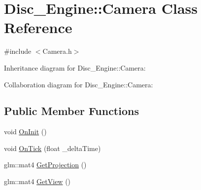\hypertarget{class_disc___engine_1_1_camera}{}\section{Disc\+\_\+\+Engine\+:\+:Camera Class Reference}
\label{class_disc___engine_1_1_camera}


{\ttfamily \#include $<$Camera.\+h$>$}



Inheritance diagram for Disc\+\_\+\+Engine\+:\+:Camera\+:


Collaboration diagram for Disc\+\_\+\+Engine\+:\+:Camera\+:
\subsection*{Public Member Functions}
\begin{DoxyCompactItemize}
\item 
void \mbox{\hyperlink{class_disc___engine_1_1_camera_a0be8fe3db58db7e2c730a472b93884b5}{On\+Init}} ()
\item 
void \mbox{\hyperlink{class_disc___engine_1_1_camera_aa243d7727350d408386badd8fe2536a3}{On\+Tick}} (float \+\_\+delta\+Time)
\item 
glm\+::mat4 \mbox{\hyperlink{class_disc___engine_1_1_camera_a57821a53306289b0f63050b43b57fa0a}{Get\+Projection}} ()
\item 
glm\+::mat4 \mbox{\hyperlink{class_disc___engine_1_1_camera_a98061be0e846f5a6e6475961a2b10d42}{Get\+View}} ()
\end{DoxyCompactItemize}
